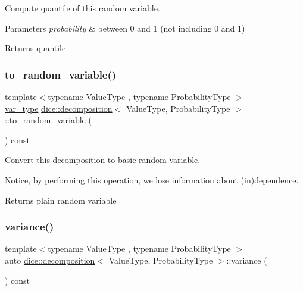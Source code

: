 Compute quantile of this random variable. 


\begin{DoxyParams}{Parameters}
{\em probability} & between 0 and 1 (not including 0 and 1)\\
\hline
\end{DoxyParams}
\begin{DoxyReturn}{Returns}
quantile 
\end{DoxyReturn}
\mbox{\label{classdice_1_1decomposition_a3483a1060e900dceae13fb73c927889b}} 
\subsubsection{\texorpdfstring{to\+\_\+random\+\_\+variable()}{to\_random\_variable()}}
{\footnotesize\ttfamily template$<$typename Value\+Type , typename Probability\+Type $>$ \\
\mbox{\hyperlink{classdice_1_1random__variable}{var\+\_\+type}} \mbox{\hyperlink{classdice_1_1decomposition}{dice\+::decomposition}}$<$ Value\+Type, Probability\+Type $>$\+::to\+\_\+random\+\_\+variable (\begin{DoxyParamCaption}{ }\end{DoxyParamCaption}) const\hspace{0.3cm}{\ttfamily [inline]}}



Convert this decomposition to basic random variable. 

Notice, by performing this operation, we lose information about (in)dependence.

\begin{DoxyReturn}{Returns}
plain random variable 
\end{DoxyReturn}
\mbox{\label{classdice_1_1decomposition_ac4ea31f289d9f6bc4567803fba5949ee}} 
\subsubsection{\texorpdfstring{variance()}{variance()}}
{\footnotesize\ttfamily template$<$typename Value\+Type , typename Probability\+Type $>$ \\
auto \mbox{\hyperlink{classdice_1_1decomposition}{dice\+::decomposition}}$<$ Value\+Type, Probability\+Type $>$\+::variance (\begin{DoxyParamCaption}{ }\end{DoxyParamCaption}) const\hspace{0.3cm}{\ttfamily [inline]}}



